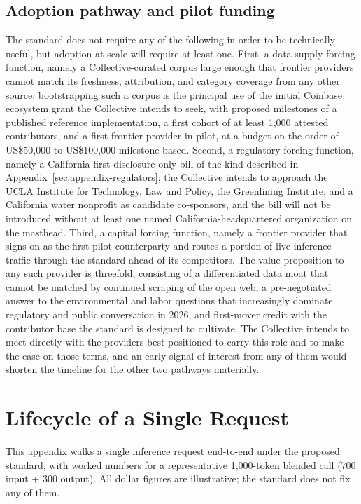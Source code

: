 \documentclass[10pt,a4paper,twocolumn]{article}
\begin{document}
\subsection*{Adoption pathway and pilot funding}

The standard does not require any of the following in order to be technically useful, but adoption at scale will require at least one. First, a data-supply forcing function, namely a Collective-curated corpus large enough that frontier providers cannot match its freshness, attribution, and category coverage from any other source; bootstrapping such a corpus is the principal use of the initial Coinbase ecosystem grant the Collective intends to seek, with proposed milestones of a published reference implementation, a first cohort of at least 1{,}000 attested contributors, and a first frontier provider in pilot, at a budget on the order of US\$50{,}000 to US\$100{,}000 milestone-based. Second, a regulatory forcing function, namely a California-first disclosure-only bill of the kind described in Appendix~\ref{sec:appendix-regulators}; the Collective intends to approach the UCLA Institute for Technology, Law and Policy, the Greenlining Institute, and a California water nonprofit as candidate co-sponsors, and the bill will not be introduced without at least one named California-headquartered organization on the masthead. Third, a capital forcing function, namely a frontier provider that signs on as the first pilot counterparty and routes a portion of live inference traffic through the standard ahead of its competitors. The value proposition to any such provider is threefold, consisting of a differentiated data moat that cannot be matched by continued scraping of the open web, a pre-negotiated answer to the environmental and labor questions that increasingly dominate regulatory and public conversation in 2026, and first-mover credit with the contributor base the standard is designed to cultivate. The Collective intends to meet directly with the providers best positioned to carry this role and to make the case on those terms, and an early signal of interest from any of them would shorten the timeline for the other two pathways materially.

\section{Lifecycle of a Single Request}
\label{sec:appendix-lifecycle}

This appendix walks a single inference request end-to-end under the proposed standard, with worked numbers for a representative 1{,}000-token blended call (700 input + 300 output). All dollar figures are illustrative; the standard does not fix any of them.
\end{document}
